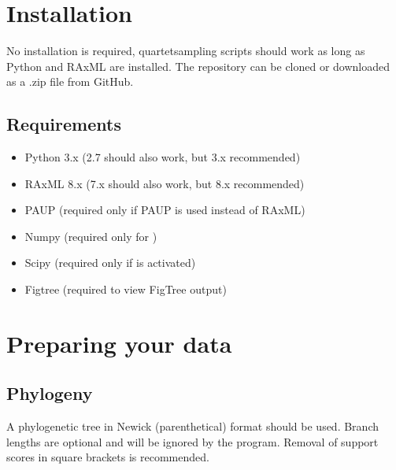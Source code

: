 \documentclass[letterpaper,12pt,english]{sphinxmanual}
\begin{document}
\section{Installation}
\label{\detokenize{intro:installation}}
No installation is required, quartetsampling scripts should work as long as Python and RAxML are installed.  The repository can be cloned or downloaded as a .zip file from GitHub.


\subsection{Requirements}
\label{\detokenize{intro:requirements}}\begin{itemize}
\item {} 
Python 3.x (2.7 should also work, but 3.x recommended) 

\item {} 
RAxML 8.x (7.x should also work, but 8.x recommended) 

\end{itemize}

\begin{itemize}
\item {} 
PAUP   (required only if PAUP is used instead of RAxML)

\item {} 
Numpy  (required only for )

\item {} 
Scipy  (required only if  is activated)

\item {} 
Figtree  (required to view FigTree output)

\end{itemize}


\section{Preparing your data}
\label{\detokenize{intro:preparing-your-data}}

\subsection{Phylogeny}
\label{\detokenize{intro:phylogeny}}
A phylogenetic tree in Newick (parenthetical) format should be used.  Branch lengths are optional and will be ignored by the program.  Removal of support scores in square brackets is recommended.
\end{document}
